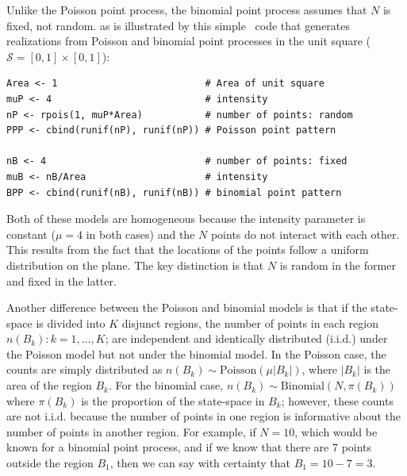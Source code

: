 Unlike the Poisson point process, the
binomial point process assumes that $N$ is fixed, not random.
as is illustrated by this simple \R~code that generates realizations
from Poisson and binomial point processes in the unit square
($\mathcal{S} = [0,1]\times[0,1]$):

\begin{samepage}
\begin{verbatim}
Area <- 1                          # Area of unit square
muP <- 4                           # intensity
nP <- rpois(1, muP*Area)           # number of points: random
PPP <- cbind(runif(nP), runif(nP)) # Poisson point pattern

nB <- 4                            # number of points: fixed
muB <- nB/Area                     # intensity
BPP <- cbind(runif(nB), runif(nB)) # binomial point pattern
\end{verbatim}
\end{samepage}

{\flushleft Both of these models are homogeneous because the intensity parameter
is constant ($\mu=4$ in both cases) and the $N$ points do not interact
with each other. This results from the fact that the locations of the
points follow a uniform distribution on the plane. The key distinction
is that $N$ is random in the former and fixed in the latter.}

Another difference between the Poisson and binomial models is that if the
state-space is divided into $K$ disjunct regions, the number of points in each
region $n(B_k): k=1,\dots,K$; are independent and identically
distributed (i.i.d.) under the Poisson model but not under the
binomial model. In the Poisson case,
the counts are simply distributed as $n(B_k) \sim
\text{Poisson}(\mu|B_k|)$, where $|B_k|$ is the area of the region
$B_k$. For the binomial case, $n(B_k) \sim
\text{Binomial}(N, \pi(B_k))$ where $\pi(B_k)$ is the proportion of
the state-space in $B_k$; however, these counts are not
i.i.d. because the number of points in one region is informative
about the number of points in another region. For example, if
$N=10$, which would be known for a binomial point process, and if we
know that there are 7 points outside the region $B_1$,
then we can say with certainty that $B_1 = 10 - 7 = 3$.

